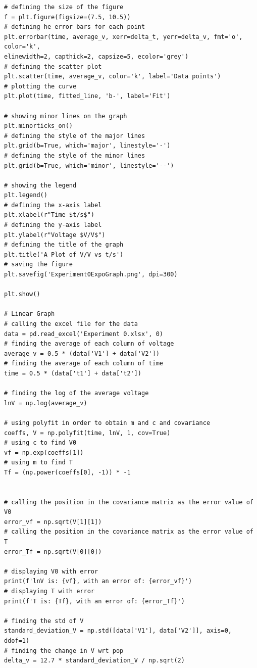 \documentclass[12pt, a4paper]{article}
\begin{document}
\begin{verbatim}
# defining the size of the figure
f = plt.figure(figsize=(7.5, 10.5))                                      
# defining he error bars for each point
plt.errorbar(time, average_v, xerr=delta_t, yerr=delta_v, fmt='o', color='k', 
elinewidth=2, capthick=2, capsize=5, ecolor='grey')                                              
# defining the scatter plot
plt.scatter(time, average_v, color='k', label='Data points')             
# plotting the curve
plt.plot(time, fitted_line, 'b-', label='Fit')                           
 
# showing minor lines on the graph
plt.minorticks_on()
# defining the style of the major lines
plt.grid(b=True, which='major', linestyle='-')
# defining the style of the minor lines
plt.grid(b=True, which='minor', linestyle='--')

# showing the legend
plt.legend()                                                             
# defining the x-axis label
plt.xlabel(r"Time $t/s$")                                                
# defining the y-axis label
plt.ylabel(r"Voltage $V/V$")                                             
# defining the title of the graph
plt.title('A Plot of V/V vs t/s')
# saving the figure
plt.savefig('Experiment0ExpoGraph.png', dpi=300)
 
plt.show()

# Linear Graph 
# calling the excel file for the data 
data = pd.read_excel('Experiment 0.xlsx', 0)
# finding the average of each column of voltage
average_v = 0.5 * (data['V1'] + data['V2'])
# finding the average of each column of time
time = 0.5 * (data['t1'] + data['t2'])

# finding the log of the average voltage 
lnV = np.log(average_v)

# using polyfit in order to obtain m and c and covariance 
coeffs, V = np.polyfit(time, lnV, 1, cov=True)
# using c to find V0
vf = np.exp(coeffs[1])
# using m to find T
Tf = (np.power(coeffs[0], -1)) * -1 


# calling the position in the covariance matrix as the error value of V0 
error_vf = np.sqrt(V[1][1]) 
# calling the position in the covariance matrix as the error value of T
error_Tf = np.sqrt(V[0][0])

# displaying V0 with error 
print(f'lnV is: {vf}, with an error of: {error_vf}')
# displaying T with error
print(f'T is: {Tf}, with an error of: {error_Tf}')

# finding the std of V 
standard_deviation_V = np.std([data['V1'], data['V2']], axis=0, ddof=1)
# finding the change in V wrt pop
delta_v = 12.7 * standard_deviation_V / np.sqrt(2)


\end{verbatim}
\end{document}
